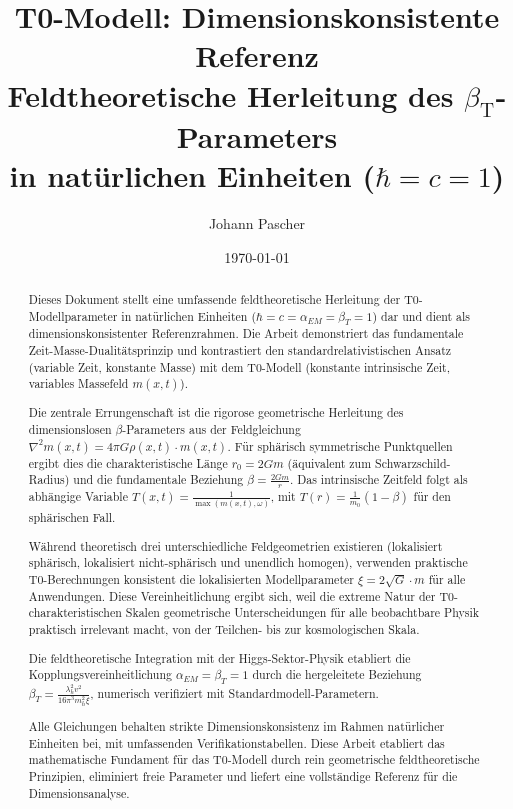 \documentclass[12pt,a4paper]{article}
\newcommand{\betaT}{\beta_{\text{T}}}
\begin{document}
	
	\title{T0-Modell: Dimensionskonsistente Referenz \\
		Feldtheoretische Herleitung des $\betaT$-Parameters \\
		in natürlichen Einheiten ($\hbar = c = 1$)}
	\author{Johann Pascher}
	\date{\today}
	
	\maketitle
	\begin{abstract}
		Dieses Dokument stellt eine umfassende feldtheoretische Herleitung der T0-Modellparameter in natürlichen Einheiten ($\hbar = c = \alpha_{EM} = \beta_T = 1$) dar und dient als dimensionskonsistenter Referenzrahmen. Die Arbeit demonstriert das fundamentale Zeit-Masse-Dualitätsprinzip und kontrastiert den standardrelativistischen Ansatz (variable Zeit, konstante Masse) mit dem T0-Modell (konstante intrinsische Zeit, variables Massefeld $m(x,t)$).
		
		Die zentrale Errungenschaft ist die rigorose geometrische Herleitung des dimensionslosen $\beta$-Parameters aus der Feldgleichung $\nabla^2 m(x,t) = 4\pi G \rho(x,t) \cdot m(x,t)$. Für sphärisch symmetrische Punktquellen ergibt dies die charakteristische Länge $r_0 = 2Gm$ (äquivalent zum Schwarzschild-Radius) und die fundamentale Beziehung $\beta = \frac{2Gm}{r}$. Das intrinsische Zeitfeld folgt als abhängige Variable $T(x,t) = \frac{1}{\max(m(x,t), \omega)}$, mit $T(r) = \frac{1}{m_0}(1-\beta)$ für den sphärischen Fall.
		
		Während theoretisch drei unterschiedliche Feldgeometrien existieren (lokalisiert sphärisch, lokalisiert nicht-sphärisch und unendlich homogen), verwenden praktische T0-Berechnungen konsistent die lokalisierten Modellparameter $\xi = 2\sqrt{G} \cdot m$ für alle Anwendungen. Diese Vereinheitlichung ergibt sich, weil die extreme Natur der T0-charakteristischen Skalen geometrische Unterscheidungen für alle beobachtbare Physik praktisch irrelevant macht, von der Teilchen- bis zur kosmologischen Skala.
		
		Die feldtheoretische Integration mit der Higgs-Sektor-Physik etabliert die Kopplungsvereinheitlichung $\alpha_{EM} = \beta_T = 1$ durch die hergeleitete Beziehung $\beta_T = \frac{\lambda_h^2 v^2}{16\pi^3 m_h^2 \xi}$, numerisch verifiziert mit Standardmodell-Parametern.
		
		Alle Gleichungen behalten strikte Dimensionskonsistenz im Rahmen natürlicher Einheiten bei, mit umfassenden Verifikationstabellen. Diese Arbeit etabliert das mathematische Fundament für das T0-Modell durch rein geometrische feldtheoretische Prinzipien, eliminiert freie Parameter und liefert eine vollständige Referenz für die Dimensionsanalyse.
	\end{abstract}
	
\end{document}
